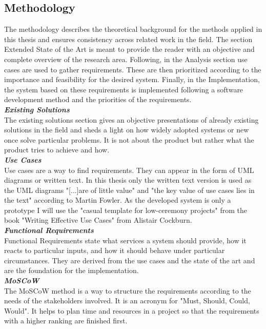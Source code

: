 \subsection{Methodology}
The methodology describes the theoretical background for the methods applied in this thesis and ensures consistency across related work in the field.
The section Extended State of the Art is meant to provide the reader with an objective and complete overview of the research area. Following, in the Analysis section use cases are used to gather requirements. These are then prioritized according to the importance and feasibility for the desired system. Finally, in the Implementation, the system based on these requirements is implemented following a software development method and the priorities of the requirements.\\[5mm]
\textbf{\textit{Existing Solutions}}\\
The existing solutions section gives an objective presentations of already existing solutions in the field and sheds a light on how widely adopted systems or new once solve particular problems. It is not about the product but rather what the product tries to achieve and how.\\[5mm]
\textbf{\textit{Use Cases}}\\
Use cases are a way to find requirements\cite{UseCase94Fowler:online}. They can appear in the form of UML diagrams or written text. In this thesis only the written text version is used as the UML diagrams "[...]are of little value" and "the key value of use cases lies in the text" according to Martin Fowler\cite{UseCase94Fowler:online}. As the developed system is only a prototype I will use the "casual template for low-ceremony projects" from the book "Writing Effective Use Cases" from Alistair Cockburn\cite{cockburn2000writingUseCases}.\\[5mm]
\textbf{\textit{Functional Requirements}}\\
Functional Requirements state what services a system should provide, how it reacts to particular inputs, and how it should behave under particular circumstances\cite{sommerville2011software}. They are derived from the use cases and the state of the art and are the foundation for the implementation.\\[5mm]
\textbf{\textit{MoSCoW}}\\
The MoSCoW method is a way to structure the requirements according to the needs of the stakeholders involved\cite{sommerville2011software}. It is an acronym for "Must, Should, Could, Would". It helps to plan time and resources in a project so that the requirements with a higher ranking are finished first.\\[5mm]
